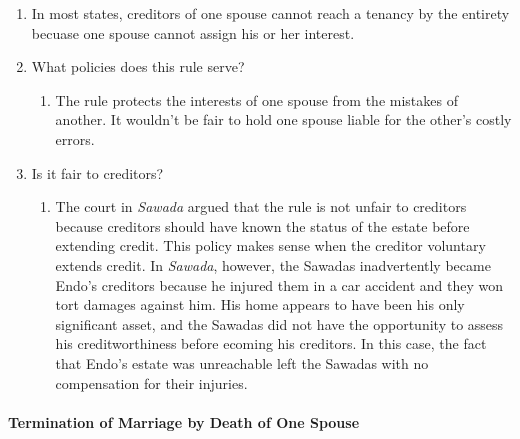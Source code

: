 \begin{enumerate}
    \item In most states, creditors of one spouse cannot reach a tenancy by 
    the entirety becuase one spouse cannot assign his or her interest.
    \item What policies does this rule serve?
    \begin{enumerate}
        \item The rule protects the interests of one spouse from the mistakes 
        of another. It wouldn't be fair to hold one spouse liable for 
        the other's costly errors.
    \end{enumerate}
    \item Is it fair to creditors?
    \begin{enumerate}
        \item The court in \emph{Sawada} argued that the rule is not unfair to 
        creditors because creditors should have known the status of the estate 
        before extending credit. This policy makes sense when the creditor 
        voluntary extends credit. In \emph{Sawada}, however, the Sawadas 
        inadvertently became Endo's creditors because he injured them in a car 
        accident and they won tort damages against him. His home appears to 
        have been his only significant asset, and the Sawadas did not have the 
        opportunity to assess his creditworthiness before ecoming his 
        creditors. In this case, the fact that Endo's estate was unreachable 
        left the Sawadas with no compensation for their injuries.
    \end{enumerate}
\end{enumerate}

\paragraph{Termination of Marriage by Death of One Spouse}

